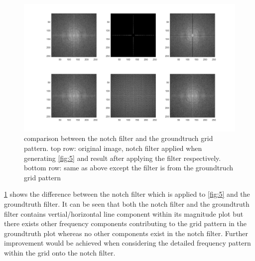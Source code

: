 \documentclass[extendedabs]{bmvc2k}
\begin{document}
\begin{figure}[h]
    \centering
    \includegraphics[width=\linewidth]{hw3_4_3}
    \caption{comparison between the notch filter and the groundtruch grid pattern. top row: original image,
    notch filter applied when generating \figurename{\ref{fig:5}} and result after applying the filter 
    respectively. bottom row: same as above except the filter is from the groundtruch grid pattern}
    \label{fig:7}
\end{figure}

\figurename{\ref{fig:7}} shows the difference between the notch filter which is applied to 
\figurename{\ref{fig:5}} and the groundtruth filter. It can be seen that both the notch
filter and the groundtruth filter contains vertial/horizontal line component within its
magnitude plot but there exists other frequency components contributing to the grid pattern
in the groundtruth plot whereas no other components exist in the notch filter.
Further improvement would be achieved when considering the detailed frequency pattern 
within the grid onto the notch filter.
\end{document}
